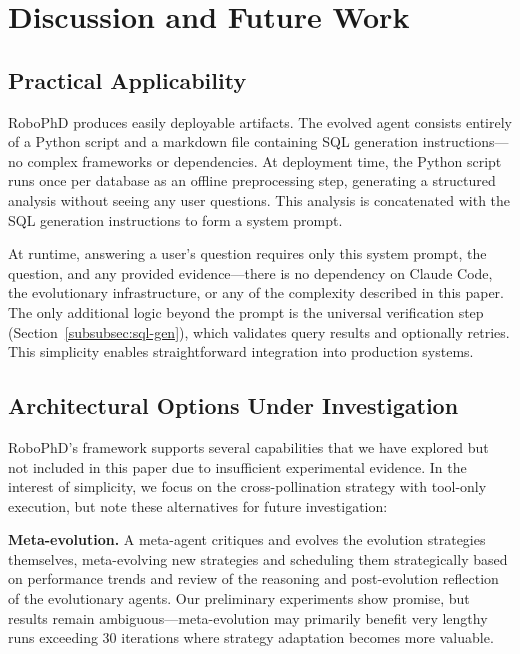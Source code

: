 \documentclass{article}
\begin{document}
\section{Discussion and Future Work}
\label{subsec:futurework}

\subsection{Practical Applicability}

RoboPhD produces easily deployable artifacts. The evolved agent consists entirely of a Python script and a markdown file containing SQL generation instructions—no complex frameworks or dependencies. At deployment time, the Python script runs once per database as an offline preprocessing step, generating a structured analysis without seeing any user questions. This analysis is concatenated with the SQL generation instructions to form a system prompt.

At runtime, answering a user's question requires only this system prompt, the question, and any provided evidence—there is no dependency on Claude Code, the evolutionary infrastructure, or any of the complexity described in this paper. The only additional logic beyond the prompt is the universal verification step (Section~\ref{subsubsec:sql-gen}), which validates query results and optionally retries. This simplicity enables straightforward integration into production systems.

\subsection{Architectural Options Under Investigation}
\label{subsec:architectural-options}

RoboPhD's framework supports several capabilities that we have explored but not included in this paper due to insufficient experimental evidence. In the interest of simplicity, we focus on the cross-pollination strategy with tool-only execution, but note these alternatives for future investigation:

\textbf{Meta-evolution.} A meta-agent critiques and evolves the evolution strategies themselves, meta-evolving new strategies and scheduling them strategically based on performance trends and review of the reasoning and post-evolution reflection of the evolutionary agents. Our preliminary experiments show promise, but results remain ambiguous---meta-evolution may primarily benefit very lengthy runs exceeding 30 iterations where strategy adaptation becomes more valuable.
\end{document}
